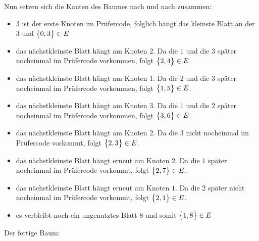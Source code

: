 \documentclass{scrreprt}
\begin{document}
\begin{enumerate}[(a)]
  Nun setzen sich die Kanten des Baumes nach und nach zusammen:
  \begin{itemize}
  \item $3$ ist der erste Knoten im Prüfercode, folglich hängt das kleinste Blatt
    an der $3$ und $\qty\big{0, 3} \in E$
  \item das nächstkleinste Blatt hängt am Knoten $2$.
    Da die $1$ und die $3$ später nocheinmal im Prüfercode vorkommen,
    folgt $\qty\big{2, 4} \in E$.
  \item das nächstkleinste Blatt hängt am Knoten $1$.
    Da die $2$ und die $3$ später nocheinmal im Prüfercode vorkommen,
    folgt $\qty\big{1, 5} \in E$.
  \item das nächstkleinste Blatt hängt am Knoten $3$.
    Da die $1$ und die $2$ später nocheinmal im Prüfercode vorkommen,
    folgt $\qty\big{3, 6} \in E$.
  \item das nächstkleinste Blatt hängt am Knoten $2$.
    Da die $3$ nicht nocheinmal im Prüfercode vorkommt,
    folgt $\qty\big{2, 3} \in E$.
  \item das nächstkleinste Blatt hängt erneut am Knoten $2$.
    Da die $1$ später nocheinmal im Prüfercode vorkommt,
    folgt $\qty\big{2, 7} \in E$.
  \item das nächstkleinste Blatt hängt erneut am Knoten $1$.
    Da die $2$ später nicht nocheinmal im Prüfercode vorkommt,
    folgt $\qty\big{2, 1} \in E$.
  \item es verbleibt noch ein ungenutztes Blatt $8$ und somit
    $\qty\big{1, 8} \in E$
  \end{itemize}
  Der fertige Baum:

\end{enumerate}
\end{document}
